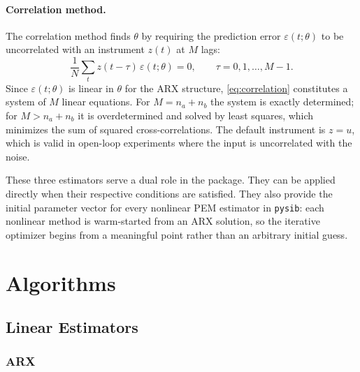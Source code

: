 \documentclass{ifacconf}
\begin{document}
\paragraph*{Correlation method.}
The correlation method finds $\theta$ by requiring the prediction error
$\varepsilon(t;\theta)$ to be uncorrelated with an instrument $z(t)$ at
$M$ lags:
\begin{equation}
    \frac{1}{N}\sum_t z(t-\tau)\,\varepsilon(t;\theta) = 0,
    \qquad \tau = 0,1,\ldots,M-1.
    \label{eq:correlation}
\end{equation}
Since $\varepsilon(t;\theta)$ is linear in $\theta$ for the ARX structure,
\eqref{eq:correlation} constitutes a system of $M$ linear equations.
For $M = n_a + n_b$ the system is exactly determined; for $M > n_a + n_b$
it is overdetermined and solved by least squares, which minimizes the sum
of squared cross-correlations.  The default instrument is $z = u$, which
is valid in open-loop experiments where the input is uncorrelated with the
noise.

These three estimators serve a dual role in the package.  They can be
applied directly when their respective conditions are satisfied.  They also
provide the initial parameter vector for every nonlinear PEM estimator in
\texttt{pysib}: each nonlinear method is warm-started from an ARX solution,
so the iterative optimizer begins from a meaningful point rather than an
arbitrary initial guess.

\section{Algorithms}
\label{sec:algorithms}

\subsection{Linear Estimators}
\label{subsec:linear-estimators}

\subsubsection{ARX}
\label{subsubsec:arx}
\end{document}
